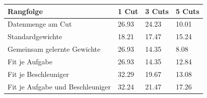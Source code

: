 \begin{tabular}{@{}llll@{}}
\toprule
Rangfolge & 1 Cut & 3 Cuts & 5 Cuts \\
\midrule
Datenmenge am Cut & 26.93 & 24.23 & 10.01 \\
Standardgewichte & 18.21 & 17.47 & 15.24 \\
Gemeinsam gelernte Gewichte & 26.93 & 14.35 & 8.08 \\
Fit je Aufgabe & 26.93 & 14.35 & 12.84 \\
Fit je Beschleuniger & 32.29 & 19.67 & 13.08 \\
Fit je Aufgabe und Beschleuniger & 32.24 & 21.47 & 17.26 \\
\bottomrule
\end{tabular}
